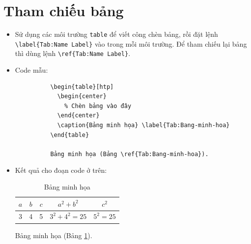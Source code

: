 \documentclass[12pt,a4paper]{article}
\begin{document}
  \section{Tham chiếu bảng}
    \begin{itemize}
      \item Sử dụng các môi trường \verb|table| để viết công chèn bảng, rồi đặt lệnh \verb|\label{Tab:Name Label}| vào trong mỗi môi trường. Để tham chiếu lại bảng thì dùng lệnh \verb|\ref{Tab:Name Label}|.
      \item Code mẫu:
        \begin{verbatim}
          \begin{table}[htp]
            \begin{center}
              % Chèn bảng vào đây
            \end{center}
            \caption{Bảng minh họa} \label{Tab:Bang-minh-hoa}
          \end{table}
    
          Bảng minh họa (Bảng \ref{Tab:Bang-minh-hoa}).
        \end{verbatim}
      \item Kết quả cho đoạn code ở trên:
        
      \begin{table}[!htp]
        \caption{Bảng minh họa} \label{Tab:Bang-minh-hoa}
        \begin{center}
          {
            \renewcommand{\arraystretch}{1.3}
            \begin{tabular}{|c|c|c|c|c|} \hline
              \(a\) & \(b\) & \(c\) & \(a^2 + b^2\) & \(c^2\) \\ \hline
              3 & 4 & 5 & \(3^2 + 4^2 = 25\) & \(5^2 = 25\) \\ \hline
            \end{tabular}
          }
        \end{center}
      \end{table}

      Bảng minh họa (Bảng \ref{Tab:Bang-minh-hoa}).
    \end{itemize}
\end{document}
